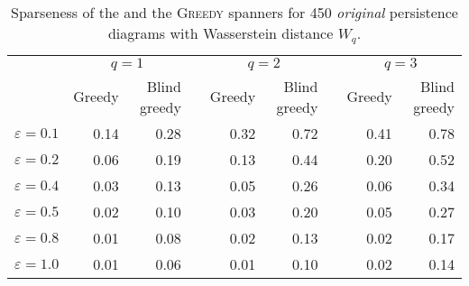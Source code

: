 \documentclass{ws-ijcga}
\newcommand{\eps}{\varepsilon}
\newcommand{\dtype}[1]{{\textit{\small #1}}}
\begin{document}
\begin{table}\centering
\begin{tabular}{@{}rrrcrrcrr@{}}\toprule
                          & \multicolumn{2}{c}{$q=1$} & \phantom{a} & \multicolumn{2}{c}{$q=2$} & \phantom{a} & \multicolumn{2}{c}{$q=3$}\\
                          \cmidrule{2-3} \cmidrule{5-6} \cmidrule{8-9}
                          & Greedy & Blind greedy && Greedy & Blind greedy && Greedy & Blind greedy \\ \midrule
$\eps = 0.1$                & 0.14  & 0.28         && 0.32  & 0.72      &&   0.41  & 0.78 \\
$\eps = 0.2$                & 0.06 & 0.19          && 0.13 & 0.44       &&   0.20  & 0.52 \\
$\eps = 0.4$               & 0.03 &  0.13          && 0.05 & 0.26        &&   0.06  & 0.34 \\
$\eps = 0.5$               & 0.02 &  0.10          && 0.03 & 0.20        &&   0.05  & 0.27 \\
$\eps = 0.8$               & 0.01 & 0.08           && 0.02  & 0.13        &&   0.02  & 0.17 \\
$\eps = 1.0$               & 0.01 &  0.06  && 0.01 & 0.10        &&   0.02  & 0.14 \\
\bottomrule
\end{tabular}
    \caption{Sparseness of the \bgrdy and the \textsc{Greedy} spanners for 450 \dtype{original} persistence diagrams
 with Wasserstein distance $W_q$.}
\label{tbl:mcgill_original_blind_greedy_spanner_sparseness}
\end{table}
\end{document}
